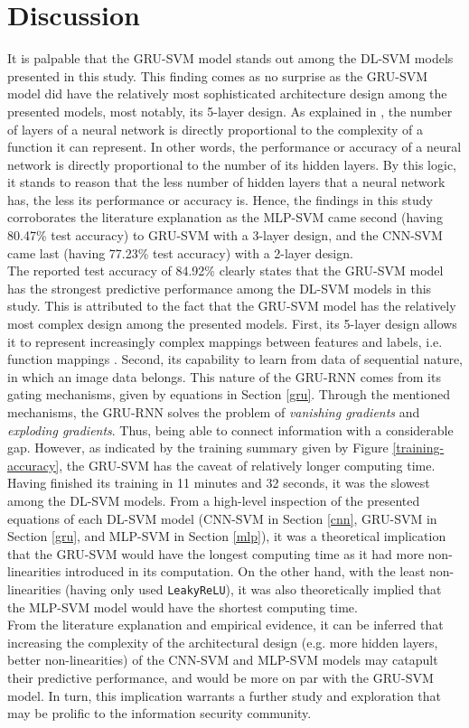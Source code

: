 \documentclass[sigconf]{acmart}
\begin{document}
\section{Discussion}
It is palpable that the GRU-SVM model stands out among the DL-SVM models presented in this study. This finding comes as no surprise as the GRU-SVM model did have the relatively most sophisticated architecture design among the presented models, most notably, its 5-layer design. As explained in \cite{Goodfellow-et-al-2016}, the number of layers of a neural network is directly proportional to the complexity of a function it can represent. In other words, the performance or accuracy of a neural network is directly proportional to the number of its hidden layers. By this logic, it stands to reason that the less number of hidden layers that a neural network has, the less its performance or accuracy is. Hence, the findings in this study corroborates the literature explanation as the MLP-SVM came second (having 80.47\% test accuracy) to GRU-SVM with a 3-layer design, and the CNN-SVM came last (having 77.23\% test accuracy) with a 2-layer design.\\
\indent	The reported test accuracy of 84.92\% clearly states that the GRU-SVM model has the strongest predictive performance among the DL-SVM models in this study. This is attributed to the fact that the GRU-SVM model has the relatively most complex design among the presented models. First, its 5-layer design allows it to represent increasingly complex mappings between features and labels, i.e. function mappings . Second, its capability to learn from data of sequential nature, in which an image data belongs. This nature of the GRU-RNN comes from its gating mechanisms, given by equations in Section \ref{gru}. Through the mentioned mechanisms, the GRU-RNN solves the problem of \textit{vanishing gradients} and \textit{exploding gradients}\cite{Cho}. Thus, being able to connect information with a considerable gap. However, as indicated by the training summary given by Figure \ref{training-accuracy}, the GRU-SVM has the caveat of relatively longer computing time. Having finished its training in 11 minutes and 32 seconds, it was the slowest among the DL-SVM models. From a high-level inspection of the presented equations of each DL-SVM model (CNN-SVM in Section \ref{cnn}, GRU-SVM in Section \ref{gru}, and MLP-SVM in Section \ref{mlp}), it was a theoretical implication that the GRU-SVM would have the longest computing time as it had more non-linearities introduced in its computation. On the other hand, with the least non-linearities (having only used \texttt{LeakyReLU}), it was also theoretically implied that the MLP-SVM model would have the shortest computing time.\\
\indent	From the literature explanation\cite{Goodfellow-et-al-2016} and empirical evidence, it can be inferred that increasing the complexity of the architectural design (e.g. more hidden layers, better non-linearities) of the CNN-SVM and MLP-SVM models may catapult their predictive performance, and would be more on par with the GRU-SVM model. In turn, this implication warrants a further study and exploration that may be prolific to the information security community.
\end{document}
